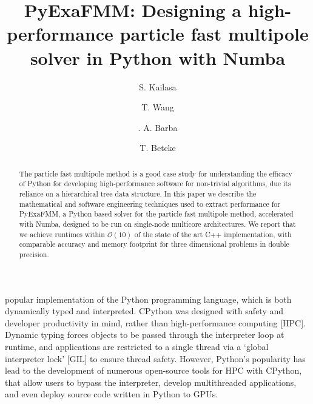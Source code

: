 \documentclass{IEEEcsmag}
\begin{document}

\title{PyExaFMM: Designing a high-performance particle fast multipole solver in Python with Numba}

\author{S. Kailasa}

\author{T. Wang}

\author{. A. Barba}

\author{T. Betcke}


\begin{abstract}
The particle fast multipole method is a good case study for understanding the efficacy of Python for developing high-performance software for non-trivial algorithms, due its reliance on a hierarchical tree data structure. In this paper we describe the mathematical and software engineering techniques used to extract performance for PyExaFMM, a Python based solver for the particle fast multipole method, accelerated with Numba, designed to be run on single-node multicore architectures. We report that we achieve runtimes within $\mathcal{O}(10)$ of the state of the art C++ implementation, with comparable accuracy and memory footprint for three dimensional problems in double precision.
\end{abstract}

\maketitle
{} popular implementation of the Python programming language, which is both dynamically typed and interpreted. CPython was designed with safety and developer productivity in mind, rather than high-performance computing [HPC]. Dynamic typing forces objects to be passed through the interpreter loop at runtime, and applications are restricted to a single thread via a `global interpreter lock' [GIL] to ensure thread safety. However, Python's popularity has lead to the development of numerous open-source tools for HPC with CPython, that allow users to bypass the interpreter, develop multithreaded applications, and even deploy source code written in Python to GPUs.
\end{document}
